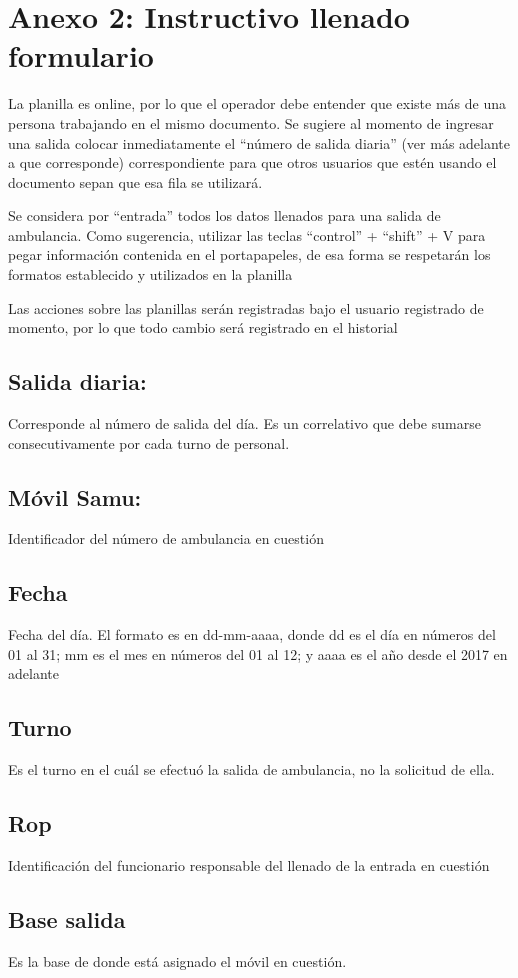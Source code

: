 \documentclass{article}
\begin{document}
\section{Anexo 2: Instructivo llenado formulario}

La planilla es online, por lo que el operador debe entender que existe más de una persona trabajando en el mismo documento. Se sugiere al momento de ingresar una salida colocar inmediatamente el “número de salida diaria” (ver más adelante a que corresponde) correspondiente para que otros usuarios que estén usando el documento sepan que esa fila se utilizará.

Se considera por “entrada” todos los datos llenados para una salida de ambulancia.
Como sugerencia, utilizar las teclas “control” + “shift” + V para pegar información contenida en el portapapeles, de esa forma se respetarán los formatos establecido y utilizados en la planilla

Las acciones sobre las planillas serán registradas bajo el usuario registrado de momento, por lo que todo cambio será registrado en el historial

\subsection{Salida diaria: }
Corresponde al número de salida del día. Es un correlativo que debe sumarse consecutivamente por cada turno de personal.
\subsection{Móvil Samu:}
Identificador del número de ambulancia en cuestión
\subsection{Fecha}
Fecha del día. El formato es en dd-mm-aaaa, donde dd es el día en números del 01 al 31; mm es el mes en números del 01 al 12; y aaaa es el año desde el 2017 en adelante
\subsection{Turno}
Es el turno en el cuál se efectuó la salida de ambulancia, no la solicitud de ella.
\subsection{Rop}
Identificación del funcionario responsable del llenado de la entrada en cuestión
\subsection{Base salida}
Es la base de donde está asignado el móvil en cuestión.
\end{document}
